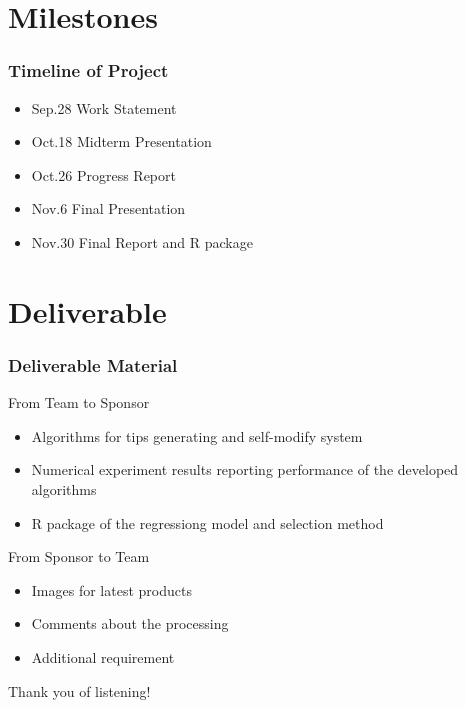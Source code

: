 \documentclass[compress,handout,10pt]{beamer}
\let\olditem\item
\renewcommand{\item}{\setlength{\itemsep}{0.5\baselineskip}\olditem}
\begin{document}
\section{Milestones}
\begin{frame}
    \frametitle{Timeline of Project}
      \begin{itemize}
         \item Sep.28  Work Statement
         \item Oct.18  Midterm Presentation
         \item Oct.26  Progress Report
         \item Nov.6   Final Presentation
         \item Nov.30 Final Report and R package
     \end{itemize}
\end{frame}

\section{Deliverable}
\begin{frame}
    \frametitle{Deliverable Material}
    From Team to Sponsor
     \begin{itemize}
      \item Algorithms for tips generating and self-modify system
      \item Numerical experiment results reporting performance of the developed algorithms
      \item R package of the regressiong model and selection method
    \end{itemize}
    From Sponsor to Team
     \begin{itemize}
       \item Images for latest products
       \item Comments about the processing
       \item Additional requirement
    \end{itemize}
\end{frame}
\begin{frame}
    \LARGE Thank you of listening!
\end{frame}
\end{document}
